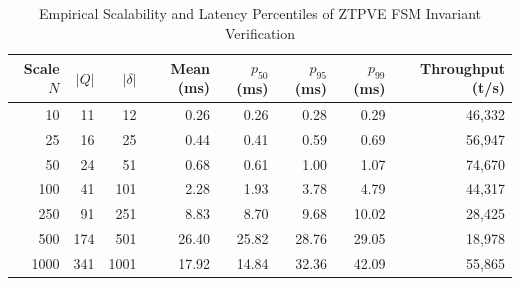 \begin{table}[htbp]
\centering
\caption{Empirical Scalability and Latency Percentiles of ZTPVE FSM Invariant Verification}
\label{tab:ztpve_scalability}
\begin{tabular}{rrrrrrrr}
\hline
\textbf{Scale $N$} & \textbf{$|Q|$} & \textbf{$|\delta|$} & \textbf{Mean (ms)} & \textbf{$p_{50}$ (ms)} & \textbf{$p_{95}$ (ms)} & \textbf{$p_{99}$ (ms)} & \textbf{Throughput (t/s)} \\
\hline
10 & 11 & 12 & 0.26 & 0.26 & 0.28 & 0.29 & 46,332 \\
25 & 16 & 25 & 0.44 & 0.41 & 0.59 & 0.69 & 56,947 \\
50 & 24 & 51 & 0.68 & 0.61 & 1.00 & 1.07 & 74,670 \\
100 & 41 & 101 & 2.28 & 1.93 & 3.78 & 4.79 & 44,317 \\
250 & 91 & 251 & 8.83 & 8.70 & 9.68 & 10.02 & 28,425 \\
500 & 174 & 501 & 26.40 & 25.82 & 28.76 & 29.05 & 18,978 \\
1000 & 341 & 1001 & 17.92 & 14.84 & 32.36 & 42.09 & 55,865 \\
\hline
\end{tabular}
\end{table}
